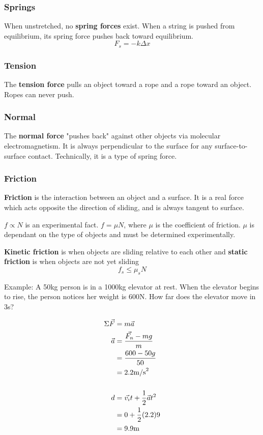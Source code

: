 \documentclass[12pt]{article}
\begin{document}
\subsubsection*{Springs}
When unstretched, no {\bf spring forces} exist. When a string is pushed from equilibrium, its spring force pushes back toward equilibrium.
\[ F_s = -k\Delta x \]

\subsubsection*{Tension}
The {\bf tension force} pulls an object toward a rope and a rope toward an object. Ropes can never push.

\subsubsection*{Normal}
The {\bf normal force} "pushes back" against other objects via molecular electromagnetism. It is always perpendicular to the surface for any surface-to-surface contact. Technically, it is a type of spring force.

\subsubsection*{Friction}
{\bf Friction} is the interaction between an object and a surface. It is a real force which acts opposite the direction of sliding, and is always tangent to surface.

$f \propto N$ is an experimental fact. $f = \mu N$, where $\mu$ is the coefficient of friction. $\mu$ is dependant on the type of objects and must be determined experimentally.

{\bf Kinetic friction} is when objects are sliding relative to each other and {\bf static friction} is when objects are not yet sliding \[ f_s \leq \mu_s N \]

Example: A 50kg person is in a 1000kg elevator at rest. When the elevator begins to rise, the person notices her weight is 600N. How far does the elevator move in 3s?

\begin{align*}
\Sigma\vec{F} &= m\vec{a}\\
\vec{a} &= \frac{\vec{F_n}-mg}{m}\\
&= \frac{600-50g}{50}\\
&= 2.2{\rm m/s}^2\\\\
d &= \vec{v_i}t + \frac{1}{2} \vec{a}t^2\\
&= 0 + \frac{1}{2} (2.2)9\\
&= 9.9{\rm m}
\end{align*}
\end{document}
